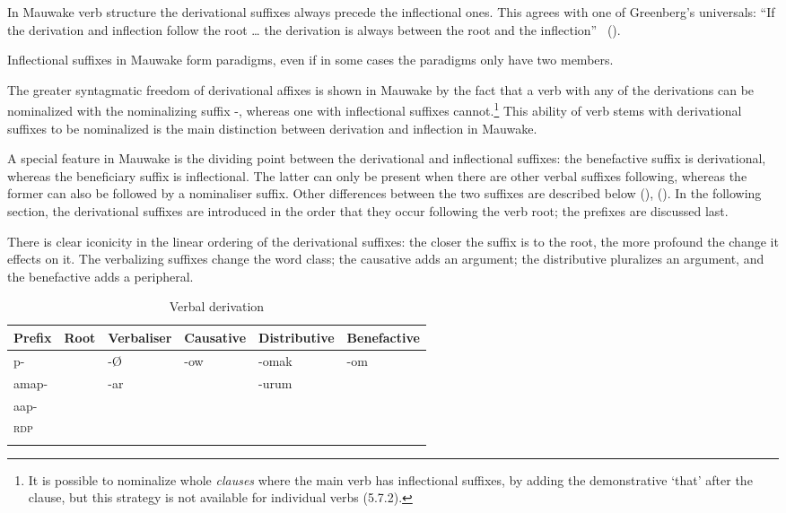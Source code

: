 In Mauwake verb structure the derivational suffixes always precede the inflectional ones. This agrees with one of {Greenberg}'s universals: ``{If the derivation and inflection follow the root {\dots} the derivation is always between the root and the inflection}'' \
(\citeyear[93]{Greenberg1966}).

Inflectional suffixes in Mauwake form paradigms, even if in some cases the paradigms only have two members.

The greater syntagmatic freedom of derivational affixes \citep[128--129]{Malkiel1978} is shown in Mauwake by the fact that a verb with any of the derivations can be nominalized with the nominalizing suffix \nobreakdash-, whereas one with inflectional suffixes cannot.\footnote{It is possible to nominalize whole \textit{clauses} where the main verb has inflectional suffixes, by adding the demonstrative  `that' after the clause, but this strategy is not available for individual verbs (5.7.2).} This ability of verb stems with derivational suffixes to be nominalized is the main distinction between derivation and inflection in Mauwake. 

A special feature in Mauwake is the dividing point between the derivational and inflectional suffixes: the benefactive suffix is derivational, whereas the beneficiary suffix is inflectional. The latter can only be present when there are other verbal suffixes following, whereas the former can also be followed by a nominaliser suffix. Other differences between the two suffixes are described below (), (). In the following section, the derivational suffixes are introduced in the order that they occur following the verb root; the prefixes are discussed last.

There is clear iconicity in the linear ordering of the derivational suffixes: the closer the suffix is to the root, the more profound the change it effects on it. The verbalizing suffixes change the word class; the causative adds an argument; the distributive pluralizes an argument, and the benefactive adds a peripheral.

\begin{table}
\caption{}
\label{} 
\begin{tabular}{llllll}
\mytoprule
Prefix & Root & Verbaliser & Causative & Distributive & Benefactive\\
\midrule
p- & & -{\O} & -ow & -omak & -om\\
amap- & & -ar & & -urum & \\
aap- & & & & & \\
\textsc{rdp} & & & & & \\
\mybottomrule
\end{tabular}
\begin{table}
\caption{Verbal derivation}
\label{tab:10}
\end{table}

\end{table}

